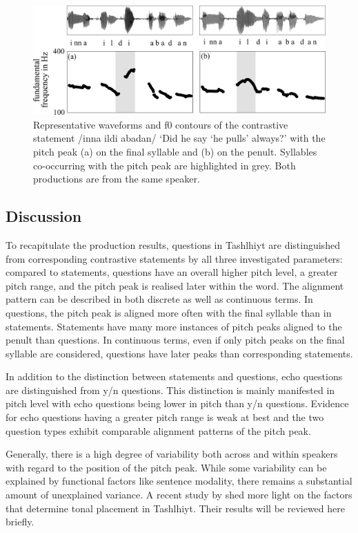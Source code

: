   \begin{figure}
  \centering 
   \includegraphics[width=1\textwidth]{figures/Figure_5_9_ildi.png}
  \caption{Representative waveforms and f0 contours of the contrastive statement /inna ildi abadan/ ‘Did he say ‘he pulls’ always?’ with the pitch peak (a) on the final syllable and (b) on the penult. Syllables co-occurring with the pitch peak are highlighted in grey. Both productions are from the same speaker.}
   \label{fig:5.9}
   \end{figure}

\subsection{Discussion}
To recapitulate the production results, questions in Tashlhiyt are distinguished from corresponding contrastive statements by all three investigated parameters: compared to statements, questions have an overall higher pitch level, a greater pitch range, and the pitch peak is realised later within the word. The alignment pattern can be described in both discrete as well as continuous terms. In questions, the pitch peak is aligned more often with the final syllable than in statements. Statements have many more instances of pitch peaks aligned to the penult than questions. In continuous terms, even if only pitch peaks on the final syllable are considered, questions have later peaks than corresponding statements.

In addition to the distinction between statements and questions, echo questions are distinguished from y/n questions. This distinction is mainly manifested in pitch level with echo questions being lower in pitch than y/n questions. Evidence for echo questions having a greater pitch range is weak at best and the two question types exhibit comparable alignment patterns of the pitch peak. 

Generally, there is a high degree of variability both across and within speakers with regard to the position of the pitch peak. While some variability can be explained by functional factors like sentence modality, there remains a substantial amount of unexplained variance. A recent study by \citet{Grice.etal2015tash} shed more light on the factors that determine tonal placement in Tashlhiyt. Their results will be reviewed here briefly. 


